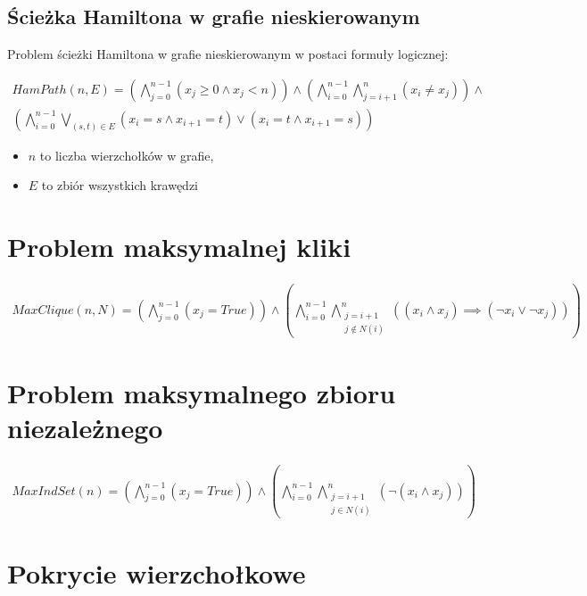 \subsection{Ścieżka Hamiltona w grafie nieskierowanym}

Problem ścieżki Hamiltona w grafie nieskierowanym w postaci formuły logicznej:

\begin{align*}
	HamPath(n, E) = \left( \bigwedge_{j=0}^{n-1} (x_j \geq 0 \land x_j < n) \right) \land 
	\left( \bigwedge_{i=0}^{n-1} \bigwedge_{j=i+1}^{n} (x_i \neq x_j) \right) \land \\
	\left( \bigwedge_{i=0}^{n-1} \bigvee_{(s,t) \in E} (x_i = s \land x_{i+1} = t) \lor (x_i = t \land x_{i+1} = s) \right)
\end{align*}
\begin{itemize}
	\item \(n\) to liczba wierzchołków w grafie,
	\item \(E\) to zbiór wszystkich krawędzi
\end{itemize}

\section{Problem maksymalnej kliki}

\begin{align*}
	MaxClique(n, N) = \left( \bigwedge_{j=0}^{n-1} (x_j = True) \right) \land 
	\left( \bigwedge_{i=0}^{n-1} \bigwedge_{\substack{j=i+1 \\ j \notin N(i)}}^{n} ((x_i \land x_j) \implies (\lnot x_i \lor \lnot x_j)) \right)	
\end{align*}

\section{Problem maksymalnego zbioru niezależnego}

\begin{align*}
	MaxIndSet(n) = \left( \bigwedge_{j=0}^{n-1} (x_j = True) \right) \land 
	\left( \bigwedge_{i=0}^{n-1} \bigwedge_{\substack{j=i+1 \\ j \in N(i)}}^{n} (\lnot(x_i \land x_j)) \right)	
\end{align*}

\section{Pokrycie wierzchołkowe}

